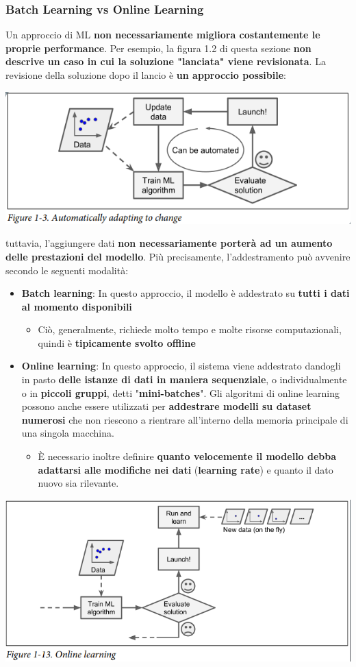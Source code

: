 \documentclass[12pt]{article}
\begin{document}
\subsubsection{Batch Learning vs Online Learning}
Un approccio di ML \textbf{non necessariamente migliora costantemente le proprie performance}.
Per esempio, la figura 1.2 di questa sezione \textbf{non descrive un caso in cui la soluzione "lanciata" viene revisionata}.
La revisione della soluzione dopo il lancio è \textbf{un approccio possibile}:
\begin{center}
    \includegraphics[width =0.65\linewidth]{Images/63.PNG}
\end{center}
tuttavia, l'aggiungere dati \textbf{non necessariamente porterà ad un aumento delle prestazioni del modello}.
Più precisamente, l'addestramento può avvenire secondo le seguenti modalità:
\begin{itemize}
    \item \textbf{Batch learning}: In questo approccio, il modello è addestrato su \textbf{tutti i dati al momento disponibili}
    \begin{itemize}
        \item Ciò, generalmente, richiede molto tempo e molte risorse computazionali, quindi è \textbf{tipicamente svolto offline}
    \end{itemize}
    \item \textbf{Online learning}: In questo approccio, il sistema viene addestrato dandogli in pasto \textbf{delle istanze di dati in maniera sequenziale}, o individualmente o in \textbf{piccoli gruppi}, detti "\textbf{mini-batches}". Gli algoritmi
    di online learning possono anche essere utilizzati per \textbf{addestrare modelli su dataset numerosi} che non riescono a rientrare all'interno della memoria principale di una singola macchina.
    \begin{itemize}
        \item È necessario inoltre definire \textbf{quanto velocemente il modello debba adattarsi alle modifiche nei dati} (\textbf{learning rate}) e quanto il dato nuovo sia rilevante.
    \end{itemize}
\end{itemize}
\begin{center}
    \includegraphics[width =0.70\linewidth]{Images/64.PNG}
\end{center}
\end{document}
